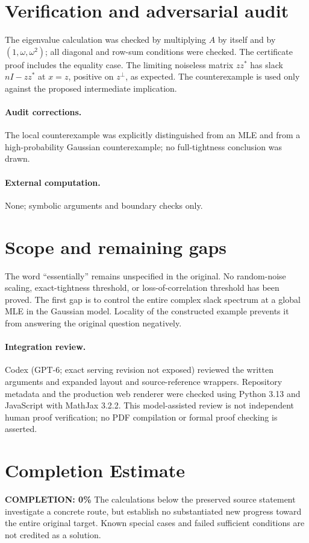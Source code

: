 \documentclass[11pt]{article}
\begin{document}
\section{Verification and adversarial audit}
The eigenvalue calculation was checked by multiplying $A$ by itself and by
$(1,\omega,\omega^2)$; all diagonal and row-sum conditions were checked. The
certificate proof includes the equality case. The limiting noiseless matrix
$zz^*$ has slack $nI-zz^*$ at $x=z$, positive on $z^\perp$, as expected.
The counterexample is used only against the proposed intermediate implication.
\paragraph{Audit corrections.} The local counterexample was explicitly distinguished from an MLE and from a high-probability Gaussian counterexample; no full-tightness conclusion was drawn.
\paragraph{External computation.} None; symbolic arguments and boundary checks only.
\section{Scope and remaining gaps}
The word ``essentially'' remains unspecified in the original. No random-noise
scaling, exact-tightness threshold, or loss-of-correlation threshold has been
proved. The first gap is to control the entire complex slack spectrum at a global
MLE in the Gaussian model. Locality of the constructed example prevents it from
answering the original question negatively.
\paragraph{Integration review.} Codex (GPT-6; exact serving revision not exposed) reviewed the written arguments and expanded layout and source-reference wrappers. Repository metadata and the production web renderer were checked using Python 3.13 and JavaScript with MathJax 3.2.2. This model-assisted review is not independent human proof verification; no PDF compilation or formal proof checking is asserted.

\section{Completion Estimate}
\noindent\textbf{COMPLETION: 0\%}
The calculations below the preserved source statement investigate a concrete route,
but establish no substantiated new progress toward the entire original target.
Known special cases and failed sufficient conditions are not credited as a solution.
\end{document}
